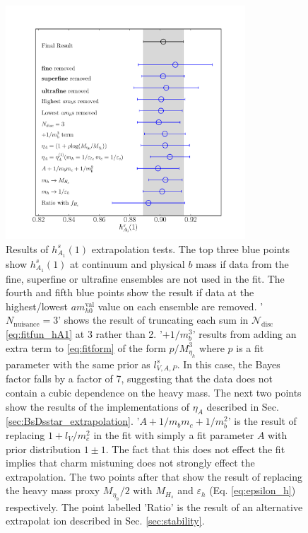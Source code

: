 \begin{figure}[htb!]
  \begin{center}
  \hspace{-18pt}
  \includegraphics[width=0.8\textwidth]{images/BsDsstar/hA1vsmh_fittests.pdf}
  
  \caption{Results of $h_{A_1}^s(1)$ extrapolation tests. The top three blue points show $h_{A_1}^s(1)$ at continuum and physical $b$ mass if data from the fine, superfine or ultrafine ensembles are not used in the fit.
    The fourth and fifth blue points show the result if data at the highest/lowest $am_{h0}^{\text{val}}$ value on each ensemble are removed.
    '$N_{\text{nuisance}}=3$' shows the result of truncating each sum in $\mathcal{N}_{\text{disc}}$ \eqref{eq:fitfun_hA1} at 3 rather than 2.
    '$+1/m_b^3$' results from adding an extra term to \eqref{eq:fitform} of the form $p/M_{\eta_h}^3$ where $p$ is a fit parameter with the same prior as $l_{V,A,P}^s$. In this case, the Bayes factor falls by a factor of 7, suggesting that the data does not contain a cubic dependence on the heavy mass.
    The next two points show the results of the implementations of $\eta_A$ described in Sec. \ref{sec:BsDsstar_extrapolation}.
    '$A+1/m_bm_c+1/m_b^2$' is the result of replacing $1+l_V/m_c^2$ in the fit with simply a fit parameter $A$ with prior distribution $1\pm 1$. The fact that this does not effect the fit implies that charm mistuning does not strongly effect the extrapolation.
    The two points after that show the result of replacing the heavy mass proxy $M_{\eta_h}/2$ with $M_{H_s}$ and $\varepsilon_h$ (Eq. \eqref{eq:epsilon_h}) respectively.
    The point labelled 'Ratio' is the result of an alternative extrapolat
    ion described in Sec. \ref{sec:stability}.  \label{fig:fittests_hA1}}
    \end{center}
\end{figure}

